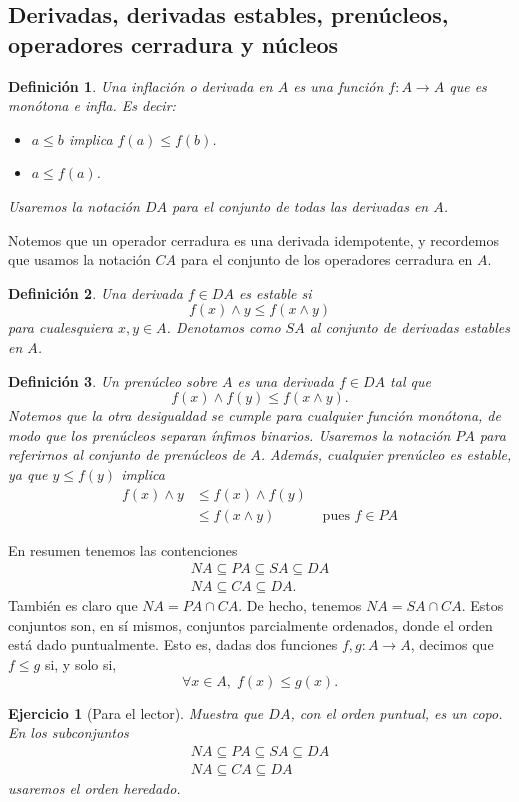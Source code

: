 \documentclass[12pt,letterpaper,titlepage]{article}
\newtheorem*{defn}{Definición}
\newtheorem{exe}{Ejercicio}
\theoremstyle{definition}
\renewcommand\inf{\wedge}
\newcommand\<{\langle}
\renewcommand\>{\rangle}
\begin{document}
\subsection{Derivadas, derivadas estables, prenúcleos, operadores cerradura y núcleos}

\begin{defn}
  Una inflación o derivada en $A$ es una función $f:A\to A$ que
  es monótona e infla.
  Es decir:
  \begin{itemize}
    \item $a\leq b$ implica $f(a) \leq f(b)$.
    \item $a\leq f(a)$.
  \end{itemize}
  Usaremos la notación $DA$ para el conjunto de todas las
  derivadas en $A$.
\end{defn}
Notemos que un operador cerradura es una derivada idempotente, y
recordemos que usamos la notación $CA$ para el conjunto de los 
operadores cerradura en $A$.

\begin{defn}
  Una derivada $f\in DA$ es \emph{estable} si
  \[
    f(x)\inf y \leq f(x\inf y)
  \]
  para cualesquiera $x,y\in A$.
  Denotamos como $SA$ al conjunto de derivadas estables en $A$.
\end{defn}

\begin{defn}
  Un prenúcleo sobre $A$ es una derivada $f\in DA$ tal que
  \[
    f(x)\inf f(y) \leq f(x\inf y)
  .\]
  Notemos que la otra desigualdad se cumple para cualquier
  función monótona, de modo que los prenúcleos separan ínfimos
  binarios.
  Usaremos la notación $PA$ para referirnos al conjunto de
  prenúcleos de $A$.
  Además, cualquier prenúcleo es estable, ya que $y\leq f(y)$ implica
  \begin{align*}
    f(x) \inf y
    &\leq f(x) \inf f(y) \\
    &\leq f(x\inf y) & \text{ pues $f\in PA$}
  \end{align*}
\end{defn}

En resumen tenemos las contenciones
\begin{align*}
  NA \subseteq PA \subseteq SA \subseteq DA \\
  NA \subseteq CA \subseteq DA.
\end{align*}
También es claro que $NA=PA\cap CA$.
De hecho, tenemos $NA=SA\cap CA$.
Estos conjuntos son, en sí mismos, conjuntos parcialmente
ordenados, donde el orden está dado puntualmente.
Esto es, dadas dos funciones $f,g:A\to A$, decimos que $f\leq g$
si, y solo si,
\[
  \forall x\in A,\; f(x)\leq g(x)
.\]
\begin{exe}[Para el lector]%
  Muestra que $DA$, con el orden puntual, es un copo.
  En los subconjuntos
  \begin{align*}
    NA \subseteq PA \subseteq SA \subseteq DA \\
    NA \subseteq CA \subseteq DA
  \end{align*}
  usaremos el orden heredado.
\end{exe}
\end{document}
